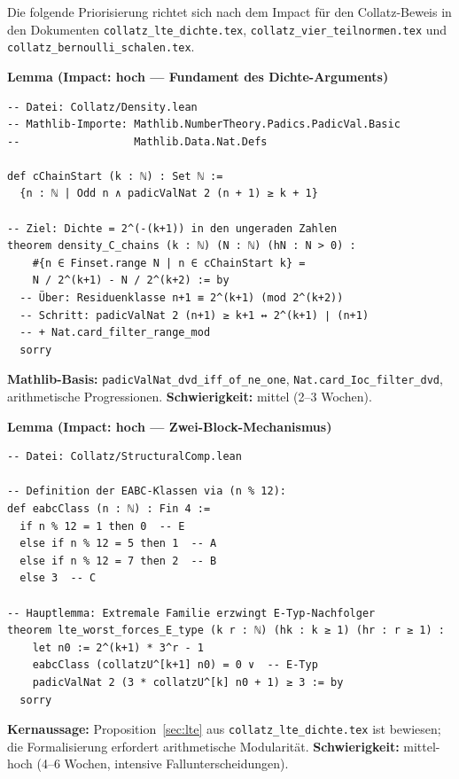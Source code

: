 \documentclass[12pt,a4paper]{article}
\begin{document}
Die folgende Priorisierung richtet sich nach dem Impact für den Collatz-Beweis
in den Dokumenten \texttt{collatz\_lte\_dichte.tex},
\texttt{collatz\_vier\_teilnormen.tex} und \texttt{collatz\_bernoulli\_schalen.tex}.

\begin{tcolorbox}[roadmap, title={Priorität 1: Dichte-Lemma für C-Ketten-Startpunkte}]
\textbf{Lemma (Impact: hoch --- Fundament des Dichte-Arguments)}
\begin{lstlisting}[language=Lean4]
-- Datei: Collatz/Density.lean
-- Mathlib-Importe: Mathlib.NumberTheory.Padics.PadicVal.Basic
--                  Mathlib.Data.Nat.Defs

def cChainStart (k : ℕ) : Set ℕ :=
  {n : ℕ | Odd n ∧ padicValNat 2 (n + 1) ≥ k + 1}

-- Ziel: Dichte = 2^(-(k+1)) in den ungeraden Zahlen
theorem density_C_chains (k : ℕ) (N : ℕ) (hN : N > 0) :
    #{n ∈ Finset.range N | n ∈ cChainStart k} =
    N / 2^(k+1) - N / 2^(k+2) := by
  -- Über: Residuenklasse n+1 ≡ 2^(k+1) (mod 2^(k+2))
  -- Schritt: padicValNat 2 (n+1) ≥ k+1 ↔ 2^(k+1) ∣ (n+1)
  -- + Nat.card_filter_range_mod
  sorry
\end{lstlisting}
\textbf{Mathlib-Basis:} \texttt{padicValNat\_dvd\_iff\_of\_ne\_one},
\texttt{Nat.card\_Ioc\_filter\_dvd}, arithmetische Progressionen.
\textbf{Schwierigkeit:} mittel (2--3 Wochen).
\end{tcolorbox}

\begin{tcolorbox}[roadmap, title={Priorität 2: Strukturelle Kompensation (LTE-Worst-Case)}]
\textbf{Lemma (Impact: hoch --- Zwei-Block-Mechanismus)}
\begin{lstlisting}[language=Lean4]
-- Datei: Collatz/StructuralComp.lean

-- Definition der EABC-Klassen via (n % 12):
def eabcClass (n : ℕ) : Fin 4 :=
  if n % 12 = 1 then 0  -- E
  else if n % 12 = 5 then 1  -- A
  else if n % 12 = 7 then 2  -- B
  else 3  -- C

-- Hauptlemma: Extremale Familie erzwingt E-Typ-Nachfolger
theorem lte_worst_forces_E_type (k r : ℕ) (hk : k ≥ 1) (hr : r ≥ 1) :
    let n0 := 2^(k+1) * 3^r - 1
    eabcClass (collatzU^[k+1] n0) = 0 ∨  -- E-Typ
    padicValNat 2 (3 * collatzU^[k] n0 + 1) ≥ 3 := by
  sorry
\end{lstlisting}
\textbf{Kernaussage:} Proposition~\ref{sec:lte} aus \texttt{collatz\_lte\_dichte.tex}
ist bewiesen; die Formalisierung erfordert arithmetische Modularität.
\textbf{Schwierigkeit:} mittel-hoch (4--6 Wochen, intensive Fallunterscheidungen).
\end{tcolorbox}
\end{document}
